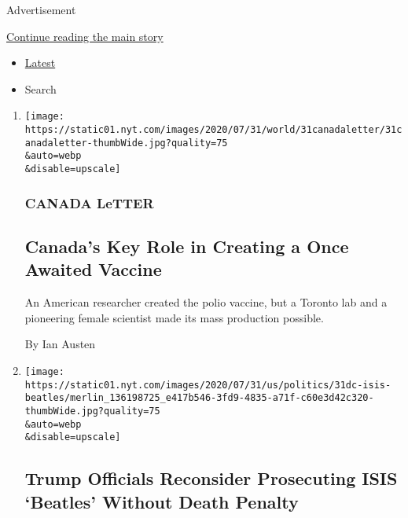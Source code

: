 Advertisement

\protect\hyperlink{after-mid3}{Continue reading the main story}

\begin{itemize}
\tightlist
\item
  \protect\hyperlink{stream-panel}{Latest}
\item
  Search
\end{itemize}

\begin{enumerate}
\def\labelenumi{\arabic{enumi}.}
\item
  \href{/2020/07/31/world/canada/leone-farrell-chemist.html}{}

  \texttt{[image: https://static01.nyt.com/images/2020/07/31/world/31canadaletter/31canadaletter-thumbWide.jpg?quality=75\\\&auto=webp\\\&disable=upscale]}

  \hypertarget{canada-letter}{%
  \subsubsection{CANADA LeTTER}\label{canada-letter}}

  \hypertarget{canadas-key-role-in-creating-a-once-awaited-vaccine}{%
  \subsection{Canada's Key Role in Creating a Once Awaited
  Vaccine}\label{canadas-key-role-in-creating-a-once-awaited-vaccine}}

  An American researcher created the polio vaccine, but a Toronto lab
  and a pioneering female scientist made its mass production possible.

  By Ian Austen
\item
  \href{/2020/07/31/world/middleeast/isis-beatles-hostages.html}{}

  \texttt{[image: https://static01.nyt.com/images/2020/07/31/us/politics/31dc-isis-beatles/merlin\_136198725\_e417b546-3fd9-4835-a71f-c60e3d42c320-thumbWide.jpg?quality=75\\\&auto=webp\\\&disable=upscale]}

  \hypertarget{trump-officials-reconsider-prosecuting-isis-beatles-without-death-penalty}{%
  \subsection{Trump Officials Reconsider Prosecuting ISIS `Beatles'
  Without Death
  Penalty}\label{trump-officials-reconsider-prosecuting-isis-beatles-without-death-penalty}}


\end{enumerate}
